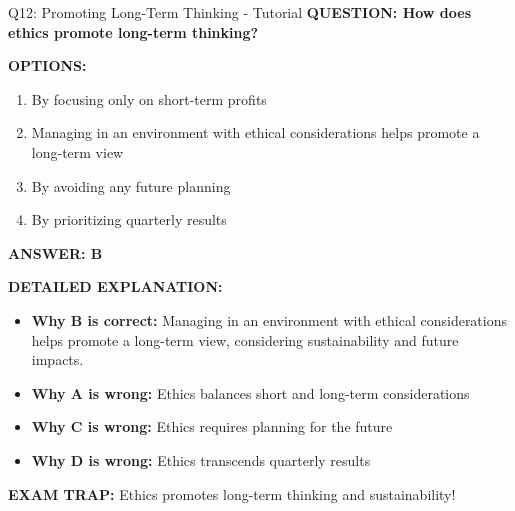 \documentclass[8pt]{beamer}
\begin{document}
	\begin{frame}{Q12: Promoting Long-Term Thinking - Tutorial}
		\fontsize{6.5}{7.5}\selectfont
		\textbf{QUESTION: How does ethics promote long-term thinking?}
		
		\vspace{0.1cm}
		\textbf{OPTIONS:}
		\begin{enumerate}
			\item By focusing only on short-term profits
			\item Managing in an environment with ethical considerations helps promote a long-term view
			\item By avoiding any future planning
			\item By prioritizing quarterly results
		\end{enumerate}
		
		\vspace{0.1cm}
		\textcolor{myblue}{\textbf{ANSWER: B}}
		
		\vspace{0.1cm}
		\textbf{DETAILED EXPLANATION:}
		\begin{itemize}
			\item \textbf{Why B is correct:} Managing in an environment with ethical considerations helps promote a long-term view, considering sustainability and future impacts.
			\item \textbf{Why A is wrong:} Ethics balances short and long-term considerations
			\item \textbf{Why C is wrong:} Ethics requires planning for the future
			\item \textbf{Why D is wrong:} Ethics transcends quarterly results
		\end{itemize}
		
		\textcolor{myred}{\textbf{EXAM TRAP:}} Ethics promotes \textcolor{myblue}{long-term thinking} and sustainability!
	\end{frame}
	
\end{document}
